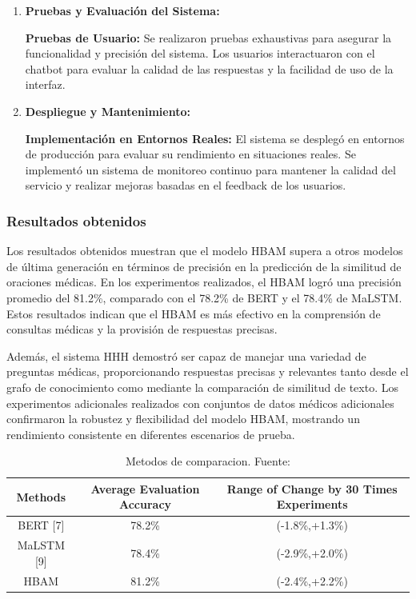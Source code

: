 \begin{enumerate}
		\item \textbf{Pruebas y Evaluación del Sistema:}
		
			\subitem \textbf{Pruebas de Usuario:} Se realizaron pruebas exhaustivas para asegurar la funcionalidad y precisión del sistema. Los usuarios interactuaron con el chatbot para evaluar la calidad de las respuestas y la facilidad de uso de la interfaz.
		
		\item \textbf{Despliegue y Mantenimiento:}
		
			\subitem \textbf{Implementación en Entornos Reales:} El sistema se desplegó en entornos de producción para evaluar su rendimiento en situaciones reales. Se implementó un sistema de monitoreo continuo para mantener la calidad del servicio y realizar mejoras basadas en el feedback de los usuarios.
		
	\end{enumerate}

	\subsubsection{Resultados obtenidos}
		Los resultados obtenidos muestran que el modelo HBAM supera a otros modelos de última generación en términos de precisión en la predicción de la similitud de oraciones médicas. En los experimentos realizados, el HBAM logró una precisión promedio del 81.2\%, comparado con el 78.2\% de BERT y el 78.4\% de MaLSTM. Estos resultados indican que el HBAM es más efectivo en la comprensión de consultas médicas y la provisión de respuestas precisas.

		Además, el sistema HHH demostró ser capaz de manejar una variedad de preguntas médicas, proporcionando respuestas precisas y relevantes tanto desde el grafo de conocimiento como mediante la comparación de similitud de texto. Los experimentos adicionales realizados con conjuntos de datos médicos adicionales confirmaron la robustez y flexibilidad del modelo HBAM, mostrando un rendimiento consistente en diferentes escenarios de prueba.

		\begin{table}[h!]
			\centering
			\caption{Metodos de comparacion. Fuente:  \cite{HHHAnOnlineMedical}}
			\begin{tabular}{ccc}
				\hline
				\textbf{Methods} & \textbf{Average Evaluation Accuracy} & \textbf{Range of Change by 30 Times Experiments} \\ \hline
				BERT [7] & 78.2\% & (-1.8\%,+1.3\%) \\
				MaLSTM [9] & 78.4\% & (-2.9\%,+2.0\%) \\
				HBAM & 81.2\% & (-2.4\%,+2.2\%) \\
				\hline
			\end{tabular}
		\end{table}
		
